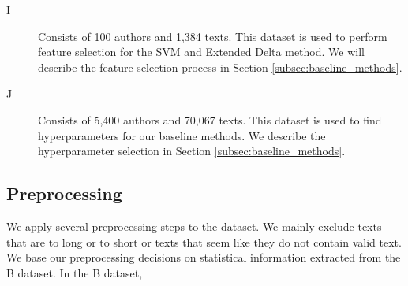 \begin{description}
    \item[\gls{I}]

        Consists of 100 authors and 1,384 texts. This dataset is used to
        perform feature selection for the \gls{SVM} and Extended Delta
        method. We will describe the feature selection process in Section
        \ref{subsec:baseline_methods}.

    \item[\gls{J}]

        Consists of 5,400 authors and 70,067 texts. This dataset is used to find
        hyperparameters for our baseline methods. We describe the hyperparameter
        selection in Section \ref{subsec:baseline_methods}.

\end{description}


\subsection{Preprocessing}

We apply several preprocessing steps to the dataset. We mainly exclude texts
that are to long or to short or texts that seem like they do not contain valid
text. We base our preprocessing decisions on statistical information extracted
from the B dataset. In the B dataset,

